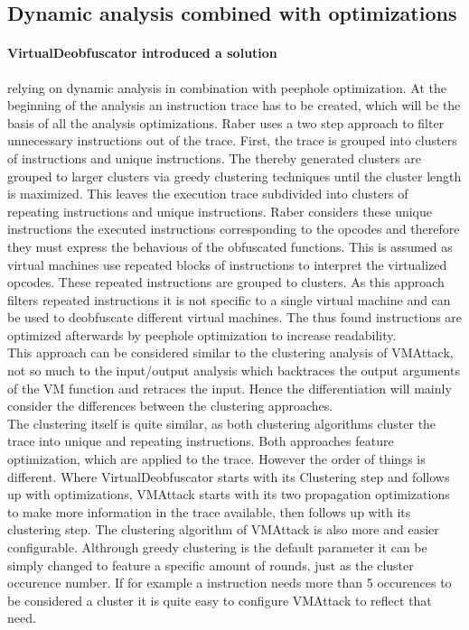 \documentclass[10pt,twoside,a4paper,bibliography=totoc]{scrbook}
\begin{document}
\subsection{Dynamic analysis combined with optimizations}
\paragraph*{VirtualDeobfuscator introduced a solution}relying on dynamic analysis in combination with peephole optimization. 
At the beginning of the analysis an instruction trace has to be created, which will be the basis of all the analysis optimizations.
Raber uses a two step approach to filter unnecessary instructions out of the trace. 
First, the trace is grouped into clusters of instructions and unique instructions. 
The thereby generated clusters are grouped to larger clusters via greedy clustering techniques until the cluster length is maximized. 
This leaves the execution trace subdivided into clusters of repeating instructions and unique instructions. 
Raber considers these unique instructions the executed instructions corresponding to the opcodes and therefore they must express the behavious of the obfuscated functions. 
This is assumed as virtual machines use repeated blocks of instructions to interpret the virtualized opcodes. These repeated instructions are grouped to clusters. As this approach filters repeated instructions it is not specific to a single virtual machine and can be used to deobfuscate different virtual machines. 
The thus found instructions are optimized afterwards by peephole optimization to increase readability.\\
This approach can be considered similar to the clustering analysis of VMAttack, not so much to the input/output analysis which backtraces the output arguments of the VM function and retraces the input. 
Hence the differentiation will mainly consider the differences between the clustering approaches.\\
The clustering itself is quite similar, as both clustering algorithms cluster the trace into unique and repeating instructions. Both approaches feature optimization, which are applied to the trace.
However the order of things is different. Where VirtualDeobfuscator starts with its Clustering step and follows up with optimizations, VMAttack starts with its two propagation optimizations to make more information in the trace available, then follows up with its clustering step.
The clustering algorithm of VMAttack is also more and easier configurable. Althrough greedy clustering is the default parameter it can be simply changed to feature a specific amount of rounds, just as the cluster occurence number. If for example a instruction needs more than 5 occurences to be considered a cluster it is quite easy to configure VMAttack to reflect that need.
\end{document}
